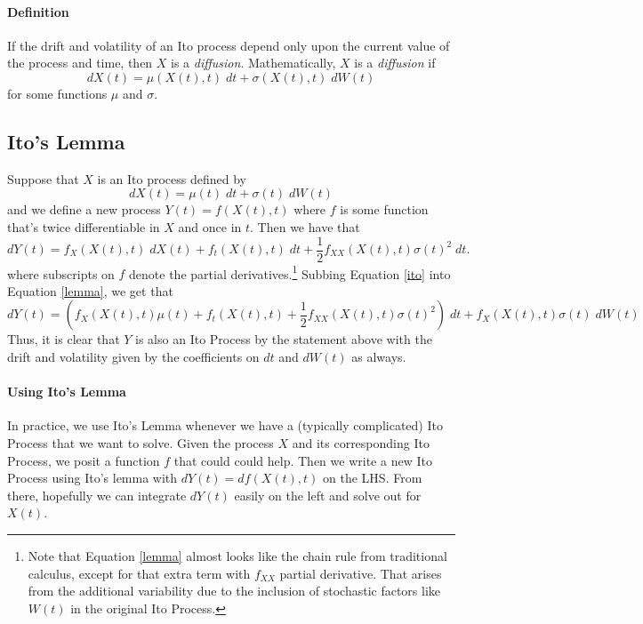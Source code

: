 \documentclass[a4paper,12pt]{scrartcl}
\begin{document}
\paragraph{Definition} If the drift and volatility of an Ito process 
depend only upon the current value of the process and time, then
$X$ is a \emph{diffusion}.  Mathematically, $X$ is a \emph{diffusion}
if
   \[ dX(t) = \mu(X(t),t)\; dt+ \sigma(X(t),t)\; dW(t) \]
for some functions $\mu$ and $\sigma$.

\subsection{Ito's Lemma}

Suppose that $X$ is an Ito process defined by 
\begin{equation}
   \label{ito}
   dX(t) = \mu(t) \; dt + \sigma(t) \; dW(t)
\end{equation}
and we define a new process $Y(t) = f(X(t),t)$ where $f$ is some
function that's twice differentiable in $X$ and once in $t$.  Then
we have that
\begin{equation}
   \label{lemma}
   dY(t) = f_X(X(t),t) \; dX(t) + f_t(X(t),t) \; dt + \frac{1}{2} 
   f_{XX}(X(t),t)\sigma(t)^2 \; dt.
\end{equation}
where subscripts on $f$ denote the partial derivatives.\footnote{Note 
that Equation \ref{lemma} almost looks like the chain rule from 
traditional calculus, except for that extra term with $f_{XX}$ partial 
derivative. That arises from the additional variability due to the 
inclusion of stochastic factors like $W(t)$ in the original Ito 
Process.} Subbing Equation \ref{ito} into Equation \ref{lemma}, 
we get that
   \[ dY(t) =\left(f_X(X(t),t)\mu(t) + f_t(X(t),t)  + \frac{1}{2} 
      f_{XX}(X(t),t)\sigma(t)^2 \right) \; dt + 
      f_X(X(t),t)\sigma(t) \; dW(t)
   \]
Thus, it is clear that $Y$ is also an Ito Process by the statement
above with the drift and volatility given by the coefficients on
$dt$ and $dW(t)$ as always.

\paragraph{Using Ito's Lemma} In practice, we use Ito's Lemma
whenever we have a (typically complicated) Ito Process that we want
to solve.  Given the process $X$ and its corresponding Ito Process, 
we posit a function $f$ that could could help. Then we write a
new Ito Process using Ito's lemma with $dY(t) = df(X(t),t)$ on the LHS.
From there, hopefully we can integrate $dY(t)$ easily on the left and
solve out for $X(t)$.
\end{document}
